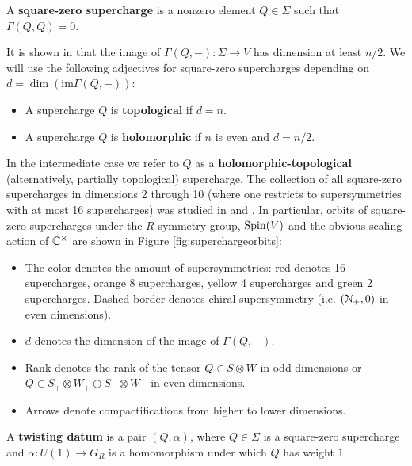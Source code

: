 \documentclass[10pt, oneside]{article}
\begin{document}

\begin{definition}
A {\bf square-zero supercharge} is a nonzero element $Q\in\Sigma$ such that $\Gamma(Q, Q)=0$.
\end{definition}

It is shown in \cite[Proposition 3.25]{ElliottSafronov} that the image of $\Gamma(Q, -)\colon \Sigma\rightarrow V$ has dimension at least $n/2$. We will use the following adjectives for square-zero supercharges depending on $d=\dim(\mathrm{im}\Gamma(Q, -))$:
\begin{itemize}
\item A supercharge $Q$ is {\bf topological} if $d = n$.

\item A supercharge $Q$ is {\bf holomorphic} if $n$ is even and $d=n/2$.
\end{itemize}

In the intermediate case we refer to $Q$ as a {\bf holomorphic-topological} (alternatively, partially topological) supercharge. The collection of all square-zero supercharges in dimensions 2 through 10 (where one restricts to supersymmetries with at most 16 supercharges) was studied in \cite{ElliottSafronov} and \cite{EagerSaberiWalcher}. In particular, orbits of square-zero supercharges under the $R$-symmetry group, $\mathrm{Spin}(V)$ and the obvious scaling action of $\mathbb C^\times$ are shown in Figure \ref{fig:superchargeorbits}:
\begin{itemize}
\item The color denotes the amount of supersymmetries: red denotes 16 supercharges, orange 8 supercharges, yellow 4 supercharges and green 2 supercharges. Dashed border denotes chiral supersymmetry (i.e. $(\mathcal N_+, 0)$ in even dimensions).

\item $d$ denotes the dimension of the image of $\Gamma(Q, -)$.

\item Rank denotes the rank of the tensor $Q\in S\otimes W$ in odd dimensions or $Q\in S_+\otimes W_+\oplus S_-\otimes W_-$ in even dimensions.

\item Arrows denote compactifications from higher to lower dimensions.
\end{itemize}

\begin{definition}
A {\bf twisting datum} is a pair $(Q, \alpha)$, where $Q\in\Sigma$ is a square-zero supercharge and $\alpha\colon U(1)\rightarrow G_R$ is a homomorphism under which $Q$ has weight $1$.
\end{definition}
\end{document}
